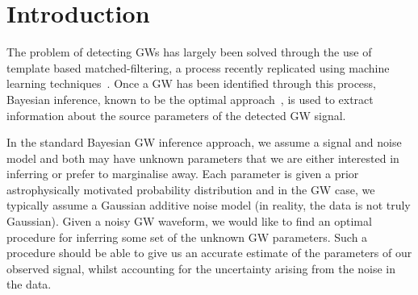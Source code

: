 \documentclass{article}
\begin{document}
%
%
%

\section{Introduction}

%
%
The problem of detecting \acp{GW} has largely been solved through the use of
template based matched-filtering, a process recently replicated using machine
learning techniques~\cite{GEORGE201864,PhysRevLett.120.141103,GebKilParHarSch}.
Once a \ac{GW} has been identified through this process, Bayesian inference,
known to be the optimal approach~\cite{2009CQGra..26o5017S}, is used to extract
information about the source parameters of the detected \ac{GW} signal.

%
%
In the standard Bayesian \ac{GW} inference approach, we assume a signal and
noise model and both may have unknown parameters that we are either interested
in inferring or prefer to marginalise away. Each parameter is given a prior
astrophysically motivated probability distribution and in the \ac{GW} case, we
typically assume a Gaussian additive noise model (in reality, the data is not
truly Gaussian). Given a noisy \ac{GW} waveform, we would like to find an
optimal procedure for inferring some set of the unknown \ac{GW} parameters.
Such a procedure should be able to give us an accurate estimate of the
parameters of our observed signal, whilst accounting for the uncertainty
arising from the noise in the data.
\end{document}
